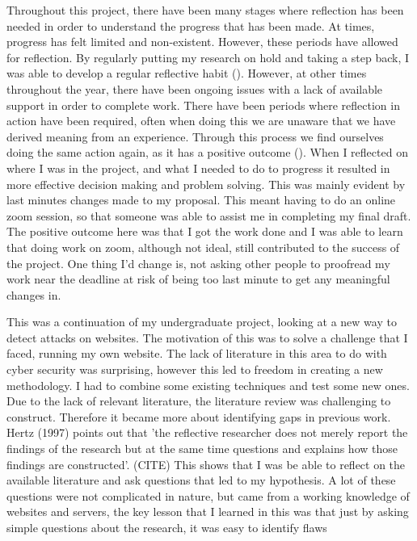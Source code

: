 

Throughout this project, there have been many stages where reflection has been needed in order to understand the progress that has been made. At times, progress has felt limited and non-existent. However, these periods have allowed for reflection. By regularly putting my research on hold and taking a step back, I was able to develop a regular reflective habit  (\cite{dyment2010quality}). However, at other times throughout the year, there have been ongoing issues with a lack of available support in order to complete work. There have been periods where reflection in action have been required, often when doing this we are unaware that we have derived meaning from an experience. Through this process we find ourselves doing the same action again, as it has a positive outcome (\cite{Schon83}). When I reflected on where I was in the project, and what I needed to do to progress it resulted in more effective decision making and problem solving. This was mainly evident by last minutes changes made to my proposal. This meant having to do an online zoom session, so that someone was able to assist me in completing my final draft. The positive outcome here was that I got the work done and I was able to learn that doing work on zoom, although not ideal, still contributed to the success of the project. One thing I'd change is, not asking other people to proofread my work near the deadline at risk of being too last minute to get any meaningful changes in.

This was a continuation of my undergraduate project, looking at a new way to detect attacks on websites. The motivation of this was to solve a challenge that I faced, running my own website. The lack of literature in this area to do with cyber security was surprising, however this led to freedom in creating a new methodology. I had to combine some existing techniques and test some new ones. Due to the lack of relevant literature, the literature review was challenging to construct. Therefore it became more about identifying gaps in previous work. Hertz (1997) points out that 'the reflective researcher does not merely report the findings of the research but at the same time questions and explains how those findings are constructed'. (CITE) This shows that I was be able to reflect on the available literature and ask questions that led to my hypothesis. A lot of these questions were not complicated in nature, but came from a working knowledge of websites and servers, the key lesson that I learned in this was that just by asking simple questions about the research, it was easy to identify flaws 

